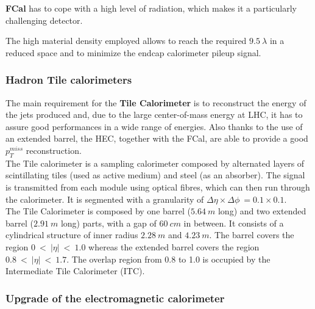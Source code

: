 \documentclass[a4paper,twoside,12pt]{article}
\begin{document}
\textbf{FCal} has to cope with a high level of radiation, which makes it a particularly challenging detector. 

 The high material density employed allows to reach the required $9.5\ \lambda$ in a reduced space and to minimize the endcap calorimeter pileup signal.  \\[2pt]

\subsubsection*{Hadron Tile calorimeters}
The main requirement for the \textbf{Tile Calorimeter} is to reconstruct the energy of the jets produced and, due to the large center-of-mass energy at LHC, it has to assure 
good performances in a wide range of energies. Also thanks to the use of an extended barrel, the HEC, together with the FCal, are able to provide a good $p_T^{miss}$ reconstruction.\\

The Tile calorimeter is a sampling calorimeter composed by alternated layers of scintillating tiles (used as active medium) and steel (as an absorber). The signal is transmitted from each module using optical fibres, which can then run through the calorimeter. It is segmented with a granularity of
$\Delta\eta \times \Delta\phi\ = 0.1 \times 0.1$.\\
The Tile Calorimeter is composed by one barrel ($5.64\ m$ long) and two extended barrel ($2.91\ m$ long) parts, with a gap of $60\ cm$ in between. It consists of a cylindrical structure of inner radius $2.28\ m$ and $4.23\ m$. The barrel covers the region $0\ <\ |\eta|\ <\ 1.0$ whereas the extended barrel covers the region $0.8\ <\ |\eta|\ <\ 1.7$. The overlap region from 0.8 to 1.0 is
occupied by the Intermediate Tile Calorimeter (ITC).\\

\subsubsection*{Upgrade of the electromagnetic calorimeter}
\end{document}
